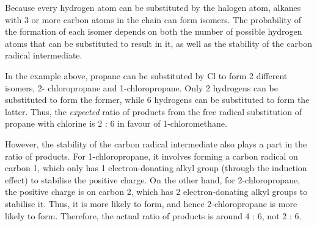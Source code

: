 		Because every hydrogen atom can be substituted by the halogen atom, alkanes with 3 or more carbon atoms in the chain
		can form isomers. The probability of the formation of each isomer depends on both the number of possible hydrogen atoms
		that can be substituted to result in it, as well as the stability of the carbon radical intermediate.





		In the example above, propane can be substituted by Cl to form 2 different isomers, 2- chloropropane and 1-chloropropane.
		Only 2 hydrogens can be substituted to form the former, while 6 hydrogens can be substituted to form the latter. Thus, the
		\textit{expected} ratio of products from the free radical substitution of propane with chlorine is 2 : 6 in
		favour of 1-chloromethane.

		However, the stability of the carbon radical intermediate also plays a part in the ratio of products. For 1-chloropropane,
		it involves forming a carbon radical on carbon 1, which only has 1 electron-donating alkyl group (through the induction effect)
		to stabilise the positive charge. On the other hand, for 2-chloropropane, the positive charge is on carbon 2, which
		has 2 electron-donating alkyl groups to stabilise it. Thus, it is more likely to form, and hence 2-chloropropane is more
		likely to form.	Therefore, the actual ratio of products is around 4 : 6, not 2 : 6.

